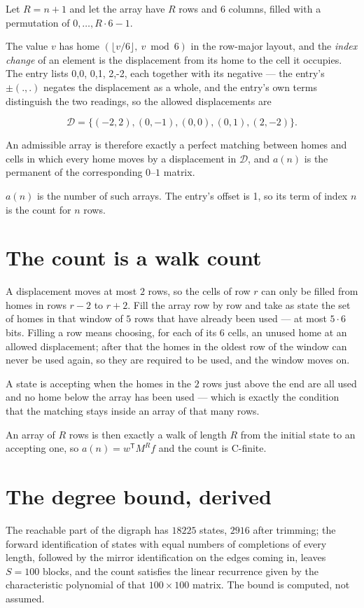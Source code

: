 \documentclass[11pt]{article}
\theoremstyle{definition}
\begin{document}
Let $R = n + 1$ and let the array have $R$ rows and $6$ columns, filled with a permutation of $0,\dots,R\cdot6-1$.

The value $v$ has home $(\lfloor v/6\rfloor,\ v \bmod 6)$ in the row-major layout, and the {\itshape index change} of an element is the displacement from its home to the cell it occupies. The entry lists 0,0, 0,1, 2,-2, each together with its negative --- the entry's $\pm(.,.)$ negates the displacement as a whole, and the entry's own terms distinguish the two readings, so the allowed displacements are

\[\mathcal{D} = \{(-2,2), (0,-1), (0,0), (0,1), (2,-2)\}.\]

An admissible array is therefore exactly a perfect matching between homes and cells in which every home moves by a displacement in $\mathcal{D}$, and $a(n)$ is the permanent of the corresponding $0$--$1$ matrix.

$a(n)$ is the number of such arrays. The entry's offset is 1, so its term of index $n$ is the count for $n$ rows.

\section{The count is a walk count}

A displacement moves at most $2$ rows, so the cells of row $r$ can only be filled from homes in rows $r-2$ to $r+2$. Fill the array row by row and take as state the set of homes in that window of $5$ rows that have already been used --- at most $5\cdot6$ bits. Filling a row means choosing, for each of its $6$ cells, an unused home at an allowed displacement; after that the homes in the oldest row of the window can never be used again, so they are required to be used, and the window moves on.

A state is accepting when the homes in the $2$ rows just above the end are all used and no home below the array has been used --- which is exactly the condition that the matching stays inside an array of that many rows.

An array of $R$ rows is then exactly a walk of length $R$ from the initial state to an accepting one, so $a(n) = w^{\mathsf T}M^{R}f$ and the count is C-finite.

\section{The degree bound, derived}

The reachable part of the digraph has $18225$ states, $2916$ after trimming; the forward identification of states with equal numbers of completions of every length, followed by the mirror identification on the edges coming in, leaves $S = 100$ blocks, and the count satisfies the linear recurrence given by the characteristic polynomial of that $100\times100$ matrix. The bound is computed, not assumed.
\end{document}
